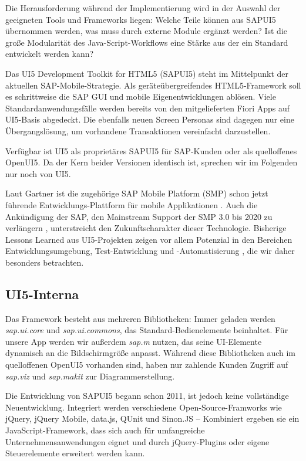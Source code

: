 Die Herausforderung während der Implementierung wird in der Auswahl der geeigneten Tools und Frameworks liegen: Welche Teile können aus SAPUI5 übernommen werden, was muss durch externe Module ergänzt werden? Ist die große Modularität des Java-Script-Workflows eine Stärke aus der ein Standard entwickelt werden kann?

Das UI5 Development Toolkit for HTML5 (SAPUI5) steht im Mittelpunkt der aktuellen SAP-Mobile-Strategie. Als geräteübergreifendes HTML5-Frame\-work soll es schrittweise die SAP GUI und mobile Eigenentwicklungen ablösen. Viele Standardanwendungsfälle werden bereits von den mitgelieferten Fiori Apps auf UI5-Basis abgedeckt. Die ebenfalls neuen Screen Personas sind dagegen nur eine Übergangslösung, um vorhandene Transaktionen vereinfacht darzustellen.

Verfügbar ist UI5 als proprietäres SAPUI5 für SAP-Kunden oder als quelloffenes OpenUI5. Da der Kern beider Versionen identisch ist, sprechen wir im Folgenden nur noch von UI5.

Laut Gartner ist die zugehörige SAP Mobile Platform (SMP) schon jetzt führende Entwicklungs-Plattform für mobile Applikationen \cite{Gartner2014}. Auch die Ankündigung der SAP, den Mainstream Support der SMP 3.0 bis 2020 zu verlängern \cite{Mielke2015}, unterstreicht den Zukunftscharakter dieser Technologie. Bisherige Lessons Learned aus UI5-Projekten zeigen vor allem Potenzial in den Bereichen Entwicklungsumgebung, Test-Entwicklung und -Automatisierung \cite{Thiebes2014}, die wir daher besonders betrachten.

\subsection{UI5-Interna}
Das Framework besteht aus mehreren Bibliotheken: Immer geladen werden \textit{sap.ui.core} und \textit{sap.ui.commons}, das Standard-Bedienelemente beinhaltet. Für unsere App werden wir außerdem \textit{sap.m} nutzen, das seine UI-Elemente dynamisch an die Bildschirmgröße anpasst. Während diese Bibliotheken auch im quelloffenen OpenUI5 vorhanden sind, haben nur zahlende Kunden Zugriff auf \textit{sap.viz} und \textit{sap.makit} zur Diagrammerstellung.

Die Entwicklung von SAPUI5 begann schon 2011, ist jedoch keine vollständige Neuentwicklung. Integriert werden verschiedene Open-Source-Framworks wie jQuery, jQuery Mobile, data.js, QUnit und Sinon.JS -- Kombiniert ergeben sie ein JavaScript-Framework, dass sich auch für umfangreiche Unternehmensanwendungen eignet und durch jQuery-Plugins oder eigene Steuerelemente erweitert werden kann.

